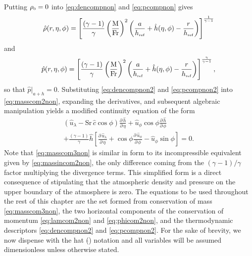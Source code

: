 Putting ${\rho_{\scriptscriptstyle 0}}=0$ into \eqref{eq:dencompnon} and \eqref{eq:pcompnon} gives 
\begin{equation}
\hat{\rho}(r,\eta,\phi) =\left[\frac{(\gamma-1)}{\gamma}\left( \frac{\mbox{M}}{\mbox{Fr}}\right)^2 \left(\frac{a}{h_{\mbox{\tiny ref}}}+\hat{h}(\eta,\phi)-\frac{r}{h_{\mbox{\tiny ref}}}\right) \right]^{\frac{1}{\gamma-1}} \label{eq:dencompnon2}
\end{equation}
and
\begin{equation}
\hat{p}(r,\eta,\phi) =\left[\frac{(\gamma-1)}{\gamma}\left( \frac{\mbox{M}}{\mbox{Fr}}\right)^2 \left(\frac{a}{h_{\mbox{\tiny ref}}}+\hat{h}(\eta,\phi)-\frac{r}{h_{\mbox{\tiny ref}}}\right) \right]^{\frac{\gamma}{\gamma-1}}, \label{eq:pcompnon2}
\end{equation}
so that $\hat{p}|_{a+h}=0$. Substituting \eqref{eq:dencompnon2} and \eqref{eq:pcompnon2} into \eqref{eq:masscom2non}, expanding the derivatives, and subsequent algebraic manipulation yields a modified continuity equation of the form
\begin{multline}
\left(\hat{u}_{\scriptscriptstyle \lambda}-\mathrm{Sr}\,\hat{c}\cos\phi\right)\frac{\partial \, \hat{h}}{\partial \, \eta} + \hat{u}_{\scriptscriptstyle \phi}\cos\phi\frac{\partial \, \hat{h}}{\partial \, \phi} \\ +\frac{(\gamma-1)}{\gamma}\hat{h}\left[\frac{\partial \, \hat{u}_{\scriptscriptstyle \lambda}}{\partial \, \eta}+\cos\phi\frac{\partial \, \hat{u}_{\scriptscriptstyle \phi}}{\partial \, \phi}-\hat{u}_{\scriptscriptstyle \phi}\sin\phi\right]=0. \label{eq:masscom3non}
\end{multline}
Note that \eqref{eq:masscom3non} is similar in form to its incompressible equivalent given by \eqref{eq:massincom2non}, the only difference coming from the $(\gamma-1)/\gamma$ factor multiplying the divergence terms. This simplified form is a direct consequence of stipulating that the atmospheric density and pressure on the upper boundary of the atmosphere is zero. The equations to be used throughout the rest of this chapter are the set formed from conservation of mass \eqref{eq:masscom3non}, the two horizontal components of the conservation of momentum \eqref{eq:lamcom2non} and \eqref{eq:phicom2non}, and the thermodynamic descriptors \eqref{eq:dencompnon2} and \eqref{eq:pcompnon2}. For the sake of brevity, we now dispense with the hat ($\hat{}$) notation and all variables will be assumed dimensionless unless otherwise stated.

